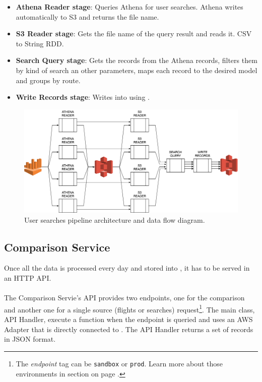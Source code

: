\begin{itemize}
    \item \textbf{Athena Reader stage}: Queries Athena for user searches. Athena writes automatically to S3 and returns the file name.
    \item \textbf{S3 Reader stage}: Gets the file name of the query result and reads it. CSV\cite{csv} to String RDD.
    \item \textbf{Search Query stage}: Gets the records from the Athena records, filters them by kind of search an other parameters, maps each record to the desired model and groups by route.
    \item \textbf{Write Records stage}: Writes into  using .
\end{itemize}

\begin{figure}[H]
\centering
\includegraphics[scale=0.45]{diagrams/user-searches-pipeline-architecture.png}
\caption{User searches pipeline architecture and data flow diagram.}
\end{figure}


\subsection{Comparison Service} \label{comparison_service}

Once all the data is processed every day and stored into , it has to be served in an HTTP\cite{http} API.
\\\\
The Comparison Servie's API provides two endpoints, one for the comparison and another one for a single source (flights or searches) request\footnote{The \textit{endpoint} tag can be \texttt{sandbox} or \texttt{prod}. Learn more about those environments in section  on page \pageref{environments}.}. The main class, API Handler, execute a function when the endpoint is queried and uses an AWS Adapter that is directly connected to . The API Handler returns a set of records in JSON format.


